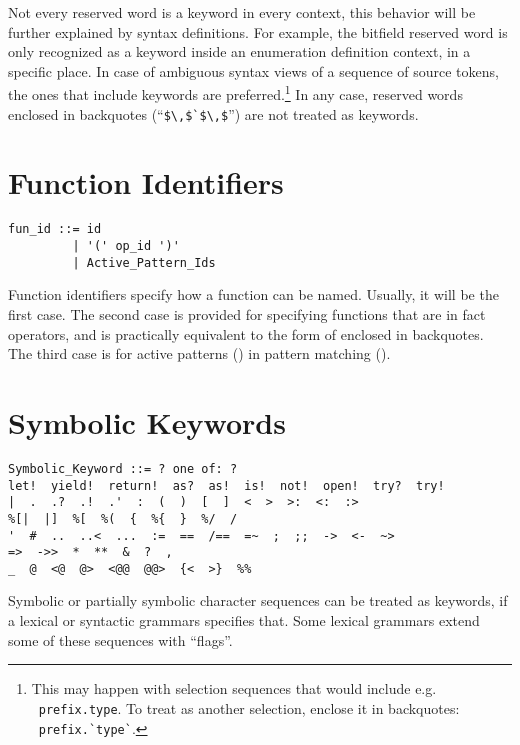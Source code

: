 Not every reserved word is a keyword in every context, this behavior will be further explained by syntax definitions. For example, the bitfield reserved word is only recognized as a keyword inside an enumeration definition context, in a specific place. In case of ambiguous syntax views of a sequence of source tokens, the ones that include keywords are preferred.\footnote{This may happen with selection sequences that would include e.g. ~\lstinline!prefix.type!. To treat  as another selection, enclose it in backquotes: ~\lstinline[deletekeywords={type}]!prefix.`type`!.} In any case, reserved words enclosed in backquotes (``\lstinline!$\,$`$\,$!'') are not treated as keywords. 




\section{Function Identifiers}
\label{sec:function-identifiers}

\syntax\begin{lstlisting}
fun_id ::= id
         | '(' op_id ')'
         | Active_Pattern_Ids
\end{lstlisting}

Function identifiers specify how a function can be named. Usually, it will be the first case. The second case is provided for specifying functions that are in fact operators, and is practically equivalent to the form of  enclosed in backquotes. The third case is for active patterns () in pattern matching (). 





\section{Symbolic Keywords}
\label{sec:symbolic-keywords}

\syntax\begin{lstlisting}[deletekeywords={of}]
Symbolic_Keyword ::= ? one of: ?
let!  yield!  return!  as?  as!  is!  not!  open!  try?  try!
|  .  .?  .!  .'  :  (  )  [  ]  <  >  >:  <:  :>
%[|  |]  %[  %(  {  %{  }  %/  /
'  #  ..  ..<  ...  :=  ==  /==  =~  ;  ;;  ->  <-  ~>
=>  ->>  *  **  &  ?  ,
_  @  <@  @>  <@@  @@>  {<  >}  %%
\end{lstlisting}

Symbolic or partially symbolic character sequences can be treated as keywords, if a lexical or syntactic grammars specifies that. Some lexical grammars extend some of these sequences with ``flags''. 





